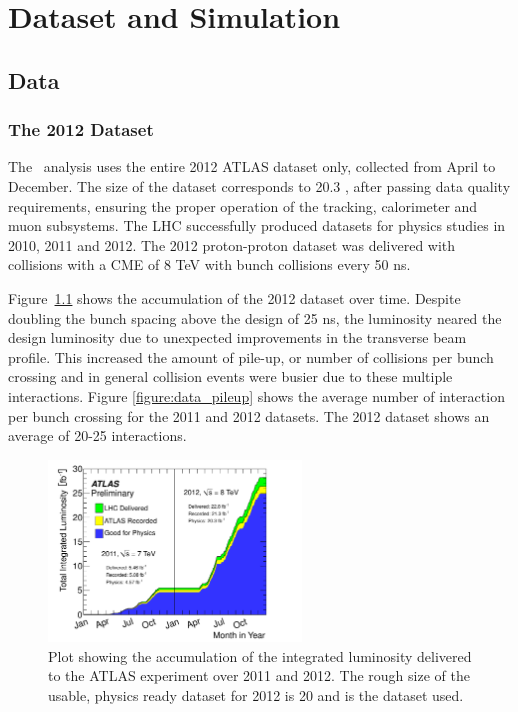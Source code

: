 \chapter[Dataset and Simulation][Dataset and Simulation]{Dataset and Simulation}
\label{chapter:data} 

\section{Data}

\subsection{The 2012 Dataset} 

The \tth\ analysis uses the entire 2012 ATLAS dataset only, collected
from April to December. The size of the dataset corresponds to 20.3 \ifb, after passing data quality
requirements, ensuring the proper operation of the tracking, calorimeter and muon subsystems.  
The LHC successfully produced datasets for physics studies in 2010, 2011 and 2012. The 2012 
proton-proton dataset was delivered with collisions with a CME of 8 TeV with bunch collisions
every 50 ns\cite{Aad:2013ucp}.

Figure~\ref{figure:data_lumi} shows the accumulation of the 2012 dataset over time. 
Despite doubling the bunch spacing above the design of 25 ns, the luminosity neared
the design luminosity due to unexpected improvements in the transverse beam profile\cite{Carli:1424362}. This increased
the amount of pile-up, or number of collisions per bunch crossing and in general collision
events were busier due to these multiple interactions. Figure \ref{figure:data_pileup} shows
the average number of interaction per bunch crossing for the 2011 and 2012 datasets. The 2012
dataset shows an average of 20-25 interactions. 

\begin{figure}[!t]
\centering 
\includegraphics[width=0.60\textwidth]{figs/data/intlumivstime2011-2012DQ.pdf}
\caption{ Plot showing the accumulation of the integrated luminosity delivered to the ATLAS experiment over 2011 and 2012. The rough size of the usable, physics ready dataset for 2012 is 20 \ifb and is the dataset used. 
}
\label{figure:data_lumi}
\end{figure}


